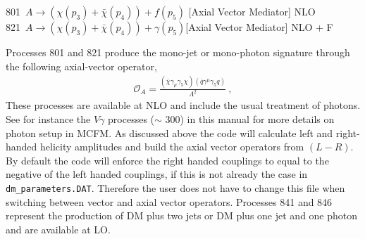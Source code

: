 801~$ A\to({\chi}(p_3)+\bar{\chi}(p_4)) +f(p_5)$ [Axial Vector Mediator]  NLO \\
821~$A\to({\chi}(p_3)+\bar{\chi}(p_4)) +\gamma(p_5) $[Axial Vector Mediator]  NLO + F 

Processes 801 and 821 produce the 
mono-jet or mono-photon signature through the following axial-vector operator, 
\begin{eqnarray}
\mathcal{O}_A=\frac{(\overline{\chi}\gamma_{\mu}\gamma_5\chi)(\overline{q}\gamma^{\mu}\gamma_5q)}{\Lambda^2}~,\label{eq:OA}
\end{eqnarray}
These processes are available at NLO and include the usual treatment
of photons. See for instance the $V\gamma$ processes ($\sim$ 300) in
this manual for more details on photon setup in MCFM. As discussed
above the code will calculate left and right-handed helicity
amplitudes and build the axial vector operators from $(L-R)$. By
default the code will enforce the right handed couplings to equal to
the negative of the left handed couplings, if this is not
already the case in {\tt dm\_parameters.DAT}. Therefore the user does
not have to change this file when switching between vector and axial
vector operators.  Processes 841 and 846 represent the production of
DM plus two jets or DM plus one jet and one photon and are available
at LO.
